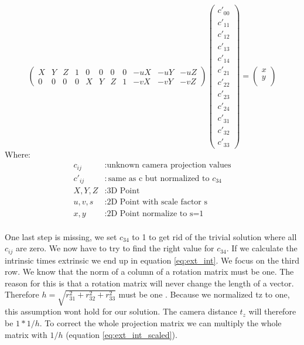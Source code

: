 \documentclass[11pt,a4paper,titlepage,oneside]{report}
\begin{document}
\begin{equation}\label{eq:projection_flat_red}
	\begin{pmatrix}
		X & Y & Z & 1 & 0 & 0 & 0 & 0 & -uX & -uY & -uZ\\
		0 & 0 & 0 & 0 & X & Y & Z & 1 & -vX & -vY & -vZ
	\end{pmatrix}
	\begin{pmatrix}
		c'_{00}\\
		c'_{11}\\
		c'_{12}\\
		c'_{13}\\
		c'_{14}\\
		c'_{21}\\
		c'_{22}\\
		c'_{23}\\
		c'_{24}\\
		c'_{31}\\
		c'_{32}\\
		c'_{33}
	\end{pmatrix}=
	\begin{pmatrix}x\\
		y\\
	\end{pmatrix}
\end{equation}
Where:
\begin{align*}
	c_{ij}		&: \text{unknown camera projection values}\\
	c'_{ij}		&: \text{same as c but normalized to $c_{34}$}\\
	X,Y,Z			&: \text{3D Point}\\
	u,v,s			&: \text{2D Point with scale factor s}\\
	x,y				&: \text{2D Point normalize to s=1}\\
\end{align*}

One last step is missing, we set $c_{34}$ to 1 to get rid of the trivial solution where all $c_{ij}$ are zero. We now have to try to find the right value for $c_{34}$. If we calculate the intrinsic times extrinsic we end up in equation \ref{eq:ext_int}. We focus on the third row. We know that the norm of a column of a rotation matrix must be one. The reason for this is that a rotation matrix will never change the length of a vector. Therefore $h=\sqrt{r_{31}^2+r_{32}^2+r_{33}^2}$ must be one \cite{Wu}. Because we normalized tz to one, this assumption wont hold for our solution. The camera distance $t_z$ will therefore be $1*1/h$. To correct the whole projection matrix we can multiply the whole matrix with $1/h$ (equation \ref{eq:ext_int_scaled}).
\end{document}
